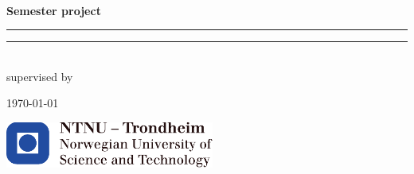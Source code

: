 \begin{titlepage}

\begin{center}
    
    ~\\[2.0cm]
    
    \Large \textbf{Semester project}\\[2.5cm]
     
    \hrule
    {\LARGE \mytitle}	%
    \vspace{0.5cm}
    \hrule
    
    \vspace{1.0cm}
    
    \LARGE \textbf{\myauthor}\\[2.5cm]
    
    \Large supervised by\par
	\mysupervisor
    
    \vfill
    {\large \today}
    
    \vspace{1.0cm}
    
    \includegraphics[height=1.5cm]{images/ntnu_logo.pdf}
    
\end{center}


\end{titlepage}